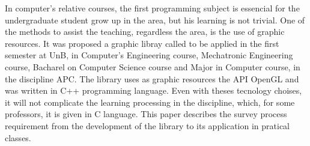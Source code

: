 In computer's relative courses, the first programming subject is essencial for the undergraduate student grow up in the area, but his learning is not trivial. One of the methods to assist the teaching, regardless the area, is the use of graphic resources. It was proposed a graphic libray called \playAPC{} to be applied in the first semester at \acrshort{UnB}, in Computer's Engineering course, Mechatronic Engineering course, Bacharel on Computer Science course and Major in Computer course, in the discipline \acrshort{APC}. The library uses as graphic resources the \acrshort{API} OpenGL and was written in C++ programming language. Even with theses tecnology choises, it will not complicate the learning processing in the discipline, which, for some professors, it is given in C language. This paper describes the survey process requirement from the development of the library to its application in pratical classes.
